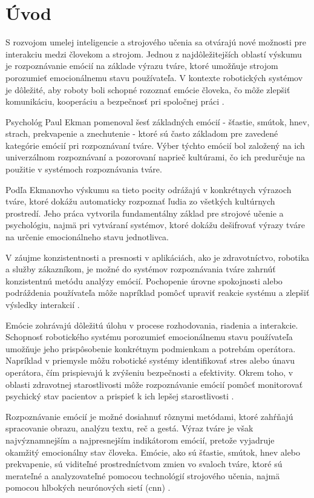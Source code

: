 \section{Úvod}
\label{sec:intro}
S rozvojom umelej inteligencie a strojového učenia sa otvárajú nové možnosti pre interakciu medzi človekom a strojom. Jednou z najdôležitejších oblastí výskumu je rozpoznávanie emócií na základe výrazu tváre, 
ktoré umožňuje strojom porozumieť emocionálnemu stavu používateľa. V kontexte robotických systémov je dôležité, aby roboty boli schopné rozoznať emócie človeka, čo môže zlepšiť komunikáciu, 
kooperáciu a bezpečnosť pri spoločnej práci \cite{article04}.

Psychológ Paul Ekman pomenoval šesť základných emócií - šťastie, smútok, hnev, strach, prekvapenie a znechutenie - ktoré sú často základom pre zavedené kategórie emócií pri rozpoznávaní tváre. 
Výber týchto emócií bol založený na ich univerzálnom rozpoznávaní a pozorovaní naprieč kultúrami, čo ich predurčuje na použitie v systémoch rozpoznávania tváre.

Podľa Ekmanovho výskumu sa tieto pocity odrážajú v konkrétnych výrazoch tváre, ktoré dokážu automaticky rozpoznať ľudia zo všetkých kultúrnych prostredí. Jeho práca vytvorila fundamentálny základ 
pre strojové učenie a psychológiu, najmä pri vytváraní systémov, ktoré dokážu dešifrovať výrazy tváre na určenie emocionálneho stavu jednotlivca.

V záujme konzistentnosti a presnosti v aplikáciách, ako je zdravotníctvo, robotika a služby zákazníkom, je možné do systémov rozpoznávania tváre zahrnúť konzistentnú metódu analýzy emócií. 
Pochopenie úrovne spokojnosti alebo podráždenia používateľa môže napríklad pomôcť upraviť reakcie systému a zlepšiť výsledky interakcií \cite{article06}.

Emócie zohrávajú dôležitú úlohu v procese rozhodovania, riadenia a interakcie. Schopnosť robotického systému porozumieť emocionálnemu stavu používateľa umožňuje jeho prispôsobenie konkrétnym podmienkam a 
potrebám operátora. Napríklad v priemysle môžu robotické systémy identifikovať stres alebo únavu operátora, čím prispievajú k zvýšeniu bezpečnosti a efektivity. Okrem toho, v oblasti zdravotnej starostlivosti 
môže rozpoznávanie emócií pomôcť monitorovať psychický stav pacientov a prispieť k ich lepšej starostlivosti \cite{article03}. 

Rozpoznávanie emócií je možné dosiahnuť rôznymi metódami, ktoré zahŕňajú spracovanie obrazu, analýzu textu, reč a gestá. Výraz tváre je však najvýznamnejším a najpresnejším indikátorom emócií, 
pretože vyjadruje okamžitý emocionálny stav človeka. Emócie, ako sú šťastie, smútok, hnev alebo prekvapenie, sú viditeľné prostredníctvom zmien vo svaloch tváre, ktoré sú merateľné a analyzovateľné 
pomocou technológií strojového učenia, najmä pomocou hlbokých neurónových sietí (\gls{cnn}) \cite{article04}.

